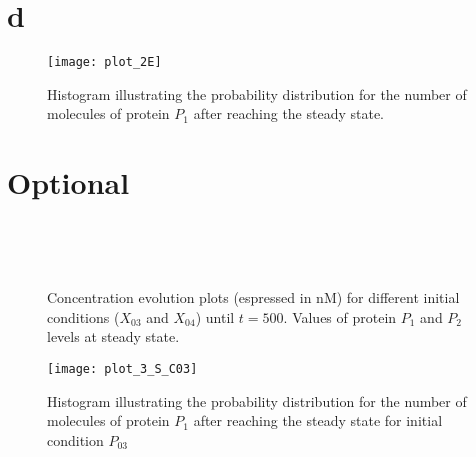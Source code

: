 \section{d}

\begin{figure}[h!]
 \centering
    \texttt{[image: plot\_2E]} \caption{Histogram illustrating the
    probability distribution for the number of molecules of protein $P_1$ after
    reaching the steady state.}
	\label{fig:plot_2E}
\end{figure}
\newpage
\setcounter{chapter}{3}
\setcounter{section}{0}
\section{Optional}
\begin{figure}[h!]
  \centering {} ~
  
   ~~~~~~~~~~~~~~~~~~~~~~~~~~~~~~
   \\
  \caption{Concentration evolution plots (espressed in nM) for different initial
  conditions ($X_{03}$ and $X_{04}$) until $t=500$. Values of protein $P_1$ and
  $P_2$ levels at steady state.}
  \label{fig:plot_detstosim_c03c04}
\end{figure}

\begin{figure}[h!]
 \centering
    \label{fig:plot_SC3}
    \texttt{[image: plot\_3\_S\_C03]}
    \caption{Histogram illustrating the
    probability distribution for the number of molecules of protein $P_1$ after
    reaching the steady state for initial condition $P_{03}$}
	
\end{figure}